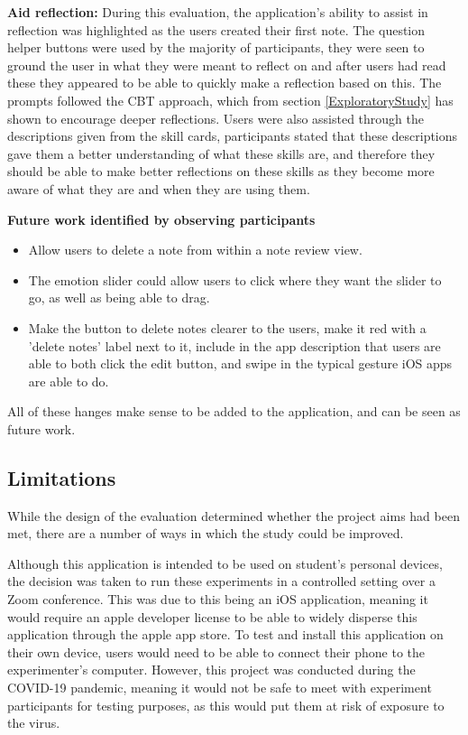 \documentclass{l4proj}
\begin{document}
\textbf{Aid reflection:} During this evaluation, the application's ability to assist in reflection was highlighted as the users created their first note. The question helper buttons were used by the majority of participants, they were seen to ground the user in what they were meant to reflect on and after users had read these they appeared to be able to quickly make a reflection based on this. The prompts followed the CBT approach, which from section \ref{ExploratoryStudy} has shown to encourage deeper reflections. Users were also assisted through the descriptions given from the skill cards, participants stated that these descriptions gave them a better understanding of what these skills are, and therefore they should be able to make better reflections on these skills as they become more aware of what they are and when they are using them.

\textbf{Future work identified by observing participants}
\begin{itemize}
    \item Allow users to delete a note from within a note review view.
    \item The emotion slider could allow users to click where they want the slider to go, as well as being able to drag.
    \item Make the button to delete notes clearer to the users, make it red with a 'delete notes' label next to it, include in the app description that users are able to both click the edit button, and swipe in the typical gesture iOS apps are able to do.
\end{itemize}
All of these hanges make sense to be added to the application, and can be seen as future work.


\subsection{Limitations}

While the design of the evaluation determined whether the project aims had been met, there are a number of ways in which the study could be improved.

Although this application is intended to be used on student's personal devices, the decision was taken to run these experiments in a controlled setting over a Zoom conference. This was due to this being an iOS application, meaning it would require an apple developer license to be able to widely disperse this application through the apple app store. To test and install this application on their own device, users would need to be able to connect their phone to the experimenter's computer. However, this project was conducted during the COVID-19 pandemic, meaning it would not be safe to meet with experiment participants for testing purposes, as this would put them at risk of exposure to the virus. 
\end{document}
